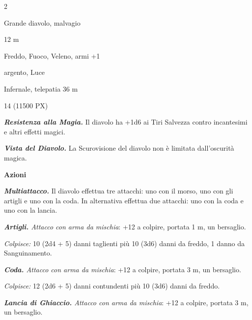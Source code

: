 \begin{multicols}{2}
{
\begin{description}[noitemsep, topsep=0pt, parsep=0pt, partopsep=0pt, itemsep=1pt, leftmargin=2.35cm,  labelwidth=2.2cm, itemindent=0cm, listparindent=0pt] %
\setlength{\baselineskip}{10pt}
\item[\textbf{Taglia/Tipo}] Grande diavolo, malvagio
\item[\textbf{Caratt.}] 
\item[\textbf{Punti Ferita}] 
\item[\textbf{Movimento}] 12 m
\item[\textbf{Tiri Salvez.}] 
\item[\textbf{Imm. Danni}] Freddo, Fuoco, Veleno, armi +1
\item[\textbf{Vulnerabilità}] argento, Luce
\item[\textbf{Sensi}] 
\item[\textbf{Linguaggi}] Infernale, telepatia 36 m
\item[\textbf{Sfida}] 14 (11500 PX)
\end{description}
\smallskip

\emph{\textbf{Resistenza alla Magia.}} Il diavolo ha +1d6 ai Tiri Salvezza contro incantesimi e altri effetti magici.

\emph{\textbf{Vista del Diavolo.}} La Scurovisione del diavolo non è limitata dall'oscurità magica.

\textbf{Azioni}

\emph{\textbf{Multiattacco.}} Il diavolo effettua tre attacchi: uno con il morso, uno con gli artigli e uno con la coda. In alternativa effettua due attacchi: uno con la coda e uno con la lancia.

\emph{\textbf{Artigli.} Attacco con arma da mischia}: +12 a colpire, portata 1 m, un bersaglio.

\emph{Colpisce:} 10 (2d4 + 5) danni taglienti più 10 (3d6) danni da freddo, 1 danno da Sanguinamento.

\emph{\textbf{Coda.} Attacco con arma da mischia}: +12 a colpire, portata 3 m, un bersaglio.

\emph{Colpisce:} 12 (2d6 + 5) danni contundenti più 10 (3d6) danni da freddo.

\emph{\textbf{Lancia di Ghiaccio.} Attacco con arma da mischia}: +12 a colpire, portata 3 m, un bersaglio.

}
\end{multicols}
